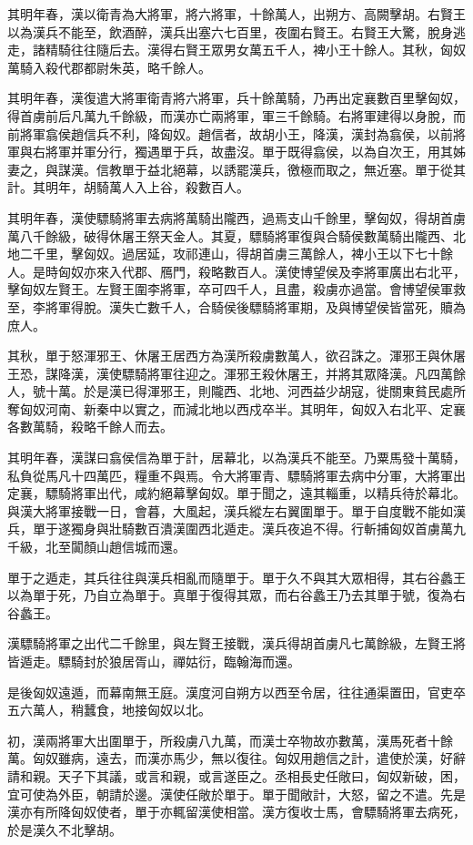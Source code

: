 其明年春，漢以衛青為大將軍，將六將軍，十餘萬人，出朔方、高闕擊胡。右賢王以為漢兵不能至，飲酒醉，漢兵出塞六七百里，夜圍右賢王。右賢王大驚，脫身逃走，諸精騎往往隨后去。漢得右賢王眾男女萬五千人，裨小王十餘人。其秋，匈奴萬騎入殺代郡都尉朱英，略千餘人。

其明年春，漢復遣大將軍衛青將六將軍，兵十餘萬騎，乃再出定襄數百里擊匈奴，得首虜前后凡萬九千餘級，而漢亦亡兩將軍，軍三千餘騎。右將軍建得以身脫，而前將軍翕侯趙信兵不利，降匈奴。趙信者，故胡小王，降漢，漢封為翕侯，以前將軍與右將軍并軍分行，獨遇單于兵，故盡沒。單于既得翕侯，以為自次王，用其姊妻之，與謀漢。信教單于益北絕幕，以誘罷漢兵，徼極而取之，無近塞。單于從其計。其明年，胡騎萬人入上谷，殺數百人。

其明年春，漢使驃騎將軍去病將萬騎出隴西，過焉支山千餘里，擊匈奴，得胡首虜萬八千餘級，破得休屠王祭天金人。其夏，驃騎將軍復與合騎侯數萬騎出隴西、北地二千里，擊匈奴。過居延，攻祁連山，得胡首虜三萬餘人，裨小王以下七十餘人。是時匈奴亦來入代郡、鴈門，殺略數百人。漢使博望侯及李將軍廣出右北平，擊匈奴左賢王。左賢王圍李將軍，卒可四千人，且盡，殺虜亦過當。會博望侯軍救至，李將軍得脫。漢失亡數千人，合騎侯後驃騎將軍期，及與博望侯皆當死，贖為庶人。

其秋，單于怒渾邪王、休屠王居西方為漢所殺虜數萬人，欲召誅之。渾邪王與休屠王恐，謀降漢，漢使驃騎將軍往迎之。渾邪王殺休屠王，并將其眾降漢。凡四萬餘人，號十萬。於是漢已得渾邪王，則隴西、北地、河西益少胡寇，徙關東貧民處所奪匈奴河南、新秦中以實之，而減北地以西戍卒半。其明年，匈奴入右北平、定襄各數萬騎，殺略千餘人而去。

其明年春，漢謀曰翕侯信為單于計，居幕北，以為漢兵不能至。乃粟馬發十萬騎，私負從馬凡十四萬匹，糧重不與焉。令大將軍青、驃騎將軍去病中分軍，大將軍出定襄，驃騎將軍出代，咸約絕幕擊匈奴。單于聞之，遠其輜重，以精兵待於幕北。與漢大將軍接戰一日，會暮，大風起，漢兵縱左右翼圍單于。單于自度戰不能如漢兵，單于遂獨身與壯騎數百潰漢圍西北遁走。漢兵夜追不得。行斬捕匈奴首虜萬九千級，北至闐顏山趙信城而還。

單于之遁走，其兵往往與漢兵相亂而隨單于。單于久不與其大眾相得，其右谷蠡王以為單于死，乃自立為單于。真單于復得其眾，而右谷蠡王乃去其單于號，復為右谷蠡王。

漢驃騎將軍之出代二千餘里，與左賢王接戰，漢兵得胡首虜凡七萬餘級，左賢王將皆遁走。驃騎封於狼居胥山，禪姑衍，臨翰海而還。

是後匈奴遠遁，而幕南無王庭。漢度河自朔方以西至令居，往往通渠置田，官吏卒五六萬人，稍蠶食，地接匈奴以北。

初，漢兩將軍大出圍單于，所殺虜八九萬，而漢士卒物故亦數萬，漢馬死者十餘萬。匈奴雖病，遠去，而漢亦馬少，無以復往。匈奴用趙信之計，遣使於漢，好辭請和親。天子下其議，或言和親，或言遂臣之。丞相長史任敞曰，匈奴新破，困，宜可使為外臣，朝請於邊。漢使任敞於單于。單于聞敞計，大怒，留之不遣。先是漢亦有所降匈奴使者，單于亦輒留漢使相當。漢方復收士馬，會驃騎將軍去病死，於是漢久不北擊胡。

